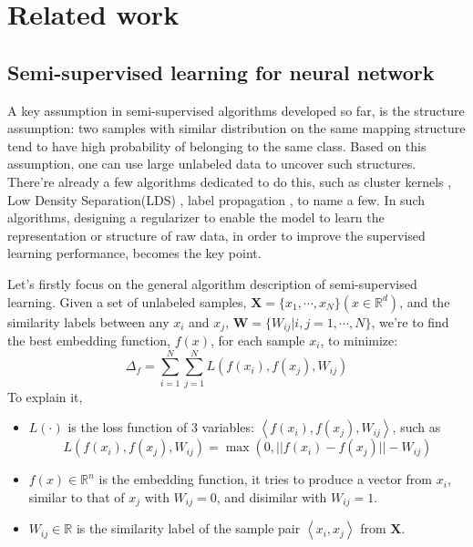 \documentclass[3p,times,procedia]{elsarticle}
\begin{document}
\section{Related work}

\subsection{Semi-supervised learning for
neural network}
A key assumption in semi-supervised 
algorithms developed so far, is the 
structure assumption: two samples with 
similar distribution on the same mapping 
structure tend to have high probability 
of belonging to the same class. Based on 
this assumption, one can use large 
unlabeled data to uncover such 
structures. There're already a few 
algorithms dedicated to do this,
such as cluster kernels
\cite{chapelle2003cluster},
Low Density Separation(LDS)
\cite{chapelle2005semi},
label propagation
\cite{zhu2002learning},
to name a few.
In such algorithms, designing a regularizer
to enable the model to learn the representation
or structure of raw data, in order to improve
the supervised learning performance, becomes
the key point.

Let's firstly focus on the general algorithm
description of semi-supervised learning.
Given a set of unlabeled samples,
$\mathbf{X}=\{x_1,\cdots,x_N\}
(x\in\mathbb{R}^d)$,
and the similarity labels between any
$x_i$ and $x_j$,
$\mathbf{W}=\{W_{ij}|i,j=1,\cdots,N\}$,
we're to find the best embedding function, 
$f(x)$, for each sample $x_i$, to minimize:
\begin{equation}
\Delta_{f}=\sum^{N}_{i=1}\sum^{N}_{j=1}L(f(x_i),f(x_j),W_{ij})
\label{eq:1}
\end{equation}
To explain it,
\begin{itemize}[]
\item $L(\cdot)$ is the loss function of 3 variables: 
$\left<f(x_i),f(x_j),W_{ij}\right>$, 
such as 
$$L(f(x_i),f(x_j),W_{ij}) = 
\max(0,||f(x_i)-f(x_j)||-W_{ij})$$
\item $f(x)\in\mathbb{R}^n$ is the embedding function, it tries to produce
a vector from $x_i$, similar to that of $x_j$ with $W_{ij}=0$,
and disimilar with $W_{ij}=1$.
\item $W_{ij}\in \mathbb{R}$ is the similarity label of the sample pair
$\left<x_i,x_j\right>$ from $\mathbf{X}$.
\end{itemize}
\end{document}

